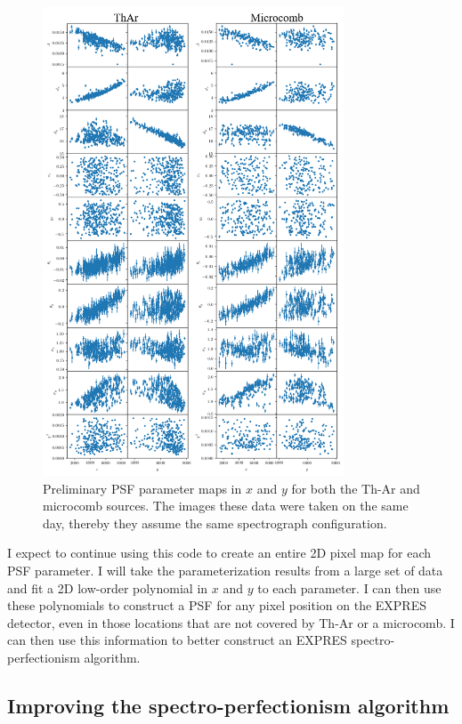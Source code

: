 \documentclass[11pt]{article}
\begin{document}
\begin{figure}
    \centering
    \includegraphics[width=0.8\textwidth]{images/psf_params.png}
    \caption{Preliminary PSF parameter maps in $x$ and $y$ for both the Th-Ar and microcomb sources. The images these data were taken on the same day, thereby they assume the same spectrograph configuration.}
    \label{fig:psf_params}
\end{figure}

I expect to continue using this code to create an entire 2D pixel map for each PSF parameter. I will take the parameterization results from a large set of data and fit a 2D low-order polynomial in $x$ and $y$ to each parameter. I can then use these polynomials to construct a PSF for any pixel position on the EXPRES detector, even in those locations that are not covered by Th-Ar or a microcomb. I can then use this information to better construct an EXPRES spectro-perfectionism algorithm.

\subsection{Improving the spectro-perfectionism algorithm}
\label{subsec:sp_tests}
\end{document}
